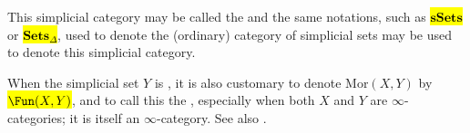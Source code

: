 \begin{definition}
    
    This simplicial category may be called the  and the same notations, such as \hl{$\mathbf{s}\mathbf{Sets}$} or \hl{$\mathbf{Sets}_\Delta$}, used to denote the (ordinary) category of simplicial sets may be used to denote this simplicial category.

    When the simplicial set $Y$ is , it is also customary to denote $\mathrm{Mor}(X,Y)$ by \hl{$\Fun(X,Y)$}, and to call this the , especially when both $X$ and $Y$ are $\infty$-categories; it is itself an $\infty$-category. See also .
\end{definition}